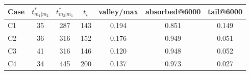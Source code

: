 \begin{tabular}{lcccccc}
\toprule
Case & $t^*_{m_1|m_2}$ & $t^*_{m_2|m_1}$ & $t_v$ & valley/max & absorbed@6000 & tail@6000 \\
\midrule
C1 & 35 & 287 & 143 & 0.194 & 0.851 & 0.149 \\
C2 & 36 & 316 & 152 & 0.176 & 0.949 & 0.051 \\
C3 & 41 & 316 & 146 & 0.120 & 0.948 & 0.052 \\
C4 & 34 & 445 & 200 & 0.137 & 0.973 & 0.027 \\
\bottomrule
\end{tabular}